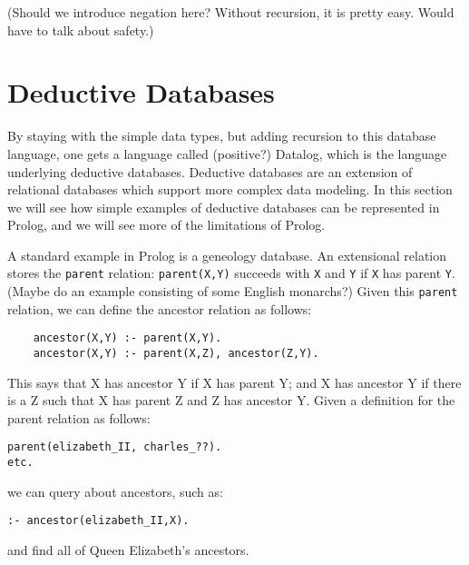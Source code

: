 (Should we introduce negation here?  Without recursion, it is pretty
easy.  Would have to talk about safety.)

\section{Deductive Databases}

By staying with the simple data types, but adding recursion to this
database language, one gets a language called (positive?) Datalog,
which is the language underlying deductive databases.  Deductive
databases are an extension of relational databases which support more
complex data modeling.  In this section we will see how simple
examples of deductive databases can be represented in Prolog, and we
will see more of the limitations of Prolog.

A standard example in Prolog is a geneology database.  An extensional
relation stores the \verb|parent| relation: \verb|parent(X,Y)|
succeeds with \verb|X| and \verb|Y| if \verb|X| has parent \verb|Y|.
(Maybe do an example consisting of some English monarchs?)  Given this
\verb|parent| relation, we can define the ancestor relation as
follows:
\begin{verbatim}
    ancestor(X,Y) :- parent(X,Y).
    ancestor(X,Y) :- parent(X,Z), ancestor(Z,Y).
\end{verbatim}
This says that X has ancestor Y if X has parent Y; and X has ancestor
Y if there is a Z such that X has parent Z and Z has ancestor Y.
Given a definition for the parent relation as follows:
\begin{verbatim}
parent(elizabeth_II, charles_??).
etc.
\end{verbatim}
we can query about ancestors, such as:
\begin{verbatim}
:- ancestor(elizabeth_II,X).
\end{verbatim}
and find all of Queen Elizabeth's ancestors.

